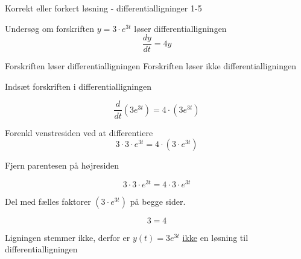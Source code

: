 \documentclass{article}
\begin{document}
\begin{exercise}{Korrekt eller forkert løsning - differentialligninger 1-5}
	
	
	Undersøg om forskriften $y = 3 \cdot e^{3t}$ løser differentialligningen
	\[
	\frac{dy}{dt} = 4y
	\]
	
\begin{multichoice}
	\itemfalse Forskriften løser differentialligningen 
	\itemtrue Forskriften løser ikke differentialligningen 
\end{multichoice}
	
	\hint
	
	Indsæt forskriften i differentialligningen
	
	\hint
	\[
	\frac{d}{dt} \left( 3 e^{3t}\right) = 4 \cdot \left( 3 e^{3t} \right)
	\]
	
	
	\hint
	
	Forenkl venstresiden ved at differentiere
	\[
	3 \cdot 3 \cdot e^{3t} = 4 \cdot \left(3 \cdot e^{3t} \right)
	\]
	
	\hint
	
	Fjern parentesen på højresiden
	
	\hint
	\[
	3 \cdot 3 \cdot e^{3t} = 4 \cdot 3 \cdot e^{3t}
	\]
	
	\hint
	Del med fælles faktorer $\left( 3 \cdot e^{3t} \right)$ på begge sider.
	
	\hint
	
	\[
	3 = 4
	\]
	
	
	\hint
	
	Ligningen stemmer ikke, derfor er $y(t) = 3 e^{3t}$ \underline{ikke} en løsning til differentialligningen
	
\end{exercise}

\newpage
\end{document}
